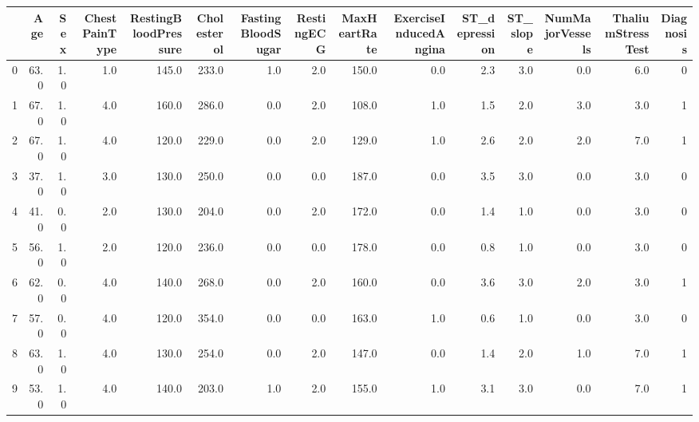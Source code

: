 \begin{tabular}{lrrrrrrrrrrrrrr}
\toprule
{} &   Age &  Sex &  ChestPainType &  RestingBloodPressure &  Cholesterol &  FastingBloodSugar &  RestingECG &  MaxHeartRate &  ExerciseInducedAngina &  ST\_depression &  ST\_slope &  NumMajorVessels &  ThaliumStressTest &  Diagnosis \\
\midrule
0 &  63.0 &  1.0 &            1.0 &                 145.0 &        233.0 &                1.0 &         2.0 &         150.0 &                    0.0 &            2.3 &       3.0 &              0.0 &                6.0 &          0 \\
1 &  67.0 &  1.0 &            4.0 &                 160.0 &        286.0 &                0.0 &         2.0 &         108.0 &                    1.0 &            1.5 &       2.0 &              3.0 &                3.0 &          1 \\
2 &  67.0 &  1.0 &            4.0 &                 120.0 &        229.0 &                0.0 &         2.0 &         129.0 &                    1.0 &            2.6 &       2.0 &              2.0 &                7.0 &          1 \\
3 &  37.0 &  1.0 &            3.0 &                 130.0 &        250.0 &                0.0 &         0.0 &         187.0 &                    0.0 &            3.5 &       3.0 &              0.0 &                3.0 &          0 \\
4 &  41.0 &  0.0 &            2.0 &                 130.0 &        204.0 &                0.0 &         2.0 &         172.0 &                    0.0 &            1.4 &       1.0 &              0.0 &                3.0 &          0 \\
5 &  56.0 &  1.0 &            2.0 &                 120.0 &        236.0 &                0.0 &         0.0 &         178.0 &                    0.0 &            0.8 &       1.0 &              0.0 &                3.0 &          0 \\
6 &  62.0 &  0.0 &            4.0 &                 140.0 &        268.0 &                0.0 &         2.0 &         160.0 &                    0.0 &            3.6 &       3.0 &              2.0 &                3.0 &          1 \\
7 &  57.0 &  0.0 &            4.0 &                 120.0 &        354.0 &                0.0 &         0.0 &         163.0 &                    1.0 &            0.6 &       1.0 &              0.0 &                3.0 &          0 \\
8 &  63.0 &  1.0 &            4.0 &                 130.0 &        254.0 &                0.0 &         2.0 &         147.0 &                    0.0 &            1.4 &       2.0 &              1.0 &                7.0 &          1 \\
9 &  53.0 &  1.0 &            4.0 &                 140.0 &        203.0 &                1.0 &         2.0 &         155.0 &                    1.0 &            3.1 &       3.0 &              0.0 &                7.0 &          1 \\
\bottomrule
\end{tabular}

